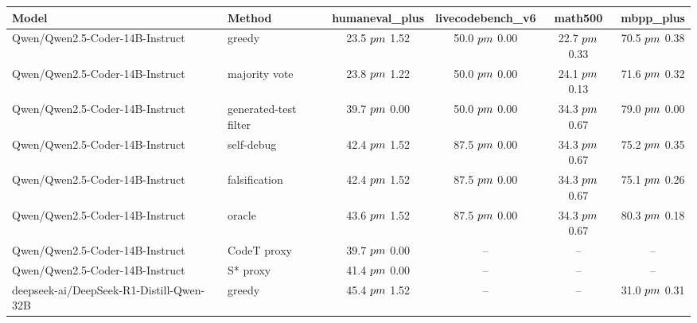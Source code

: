 \begin{tabular}{llcccc}
\toprule
Model & Method & humaneval_plus & livecodebench_v6 & math500 & mbpp_plus \\
\midrule
Qwen/Qwen2.5-Coder-14B-Instruct & greedy & 23.5 $\\pm$ 1.52 & 50.0 $\\pm$ 0.00 & 22.7 $\\pm$ 0.33 & 70.5 $\\pm$ 0.38 \\
Qwen/Qwen2.5-Coder-14B-Instruct & majority vote & 23.8 $\\pm$ 1.22 & 50.0 $\\pm$ 0.00 & 24.1 $\\pm$ 0.13 & 71.6 $\\pm$ 0.32 \\
Qwen/Qwen2.5-Coder-14B-Instruct & generated-test filter & 39.7 $\\pm$ 0.00 & 50.0 $\\pm$ 0.00 & 34.3 $\\pm$ 0.67 & 79.0 $\\pm$ 0.00 \\
Qwen/Qwen2.5-Coder-14B-Instruct & self-debug & 42.4 $\\pm$ 1.52 & 87.5 $\\pm$ 0.00 & 34.3 $\\pm$ 0.67 & 75.2 $\\pm$ 0.35 \\
Qwen/Qwen2.5-Coder-14B-Instruct & falsification & 42.4 $\\pm$ 1.52 & 87.5 $\\pm$ 0.00 & 34.3 $\\pm$ 0.67 & 75.1 $\\pm$ 0.26 \\
Qwen/Qwen2.5-Coder-14B-Instruct & oracle & 43.6 $\\pm$ 1.52 & 87.5 $\\pm$ 0.00 & 34.3 $\\pm$ 0.67 & 80.3 $\\pm$ 0.18 \\
Qwen/Qwen2.5-Coder-14B-Instruct & CodeT proxy & 39.7 $\\pm$ 0.00 & -- & -- & -- \\
Qwen/Qwen2.5-Coder-14B-Instruct & S* proxy & 41.4 $\\pm$ 0.00 & -- & -- & -- \\
deepseek-ai/DeepSeek-R1-Distill-Qwen-32B & greedy & 45.4 $\\pm$ 1.52 & -- & -- & 31.0 $\\pm$ 0.31 \\

\end{tabular}
